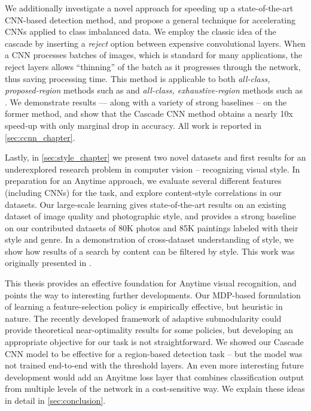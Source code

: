 We additionally investigate a novel approach for speeding up a state-of-the-art CNN-based detection method, and propose a general technique for accelerating CNNs applied to class imbalanced data.
We employ the classic idea of the cascade by inserting a \emph{reject} option between expensive convolutional layers.
When a CNN processes batches of images, which is standard for many applications, the reject layers allows ``thinning'' of the batch as it progresses through the network, thus saving processing time.
This method is applicable to both \emph{all-class, proposed-region} methods such as \cite{Girshick-CVPR-2014} and \emph{all-class, exhaustive-region} methods such as \cite{He-ECCV-2014}.
We demonstrate results --- along with a variety of strong baselines -- on the former method, and show that the Cascade CNN method obtains a nearly 10x speed-up with only marginal drop in accuracy.
All work is reported in \autoref{sec:ccnn_chapter}.

Lastly, in \autoref{sec:style_chapter} we present two novel datasets and first results for an underexplored research problem in computer vision -- recognizing visual style.
In preparation for an Anytime approach, we evaluate several different features (including CNNs) for the task, and explore content-style correlations in our datasets.
Our large-scale learning gives state-of-the-art results on an existing dataset of image quality and photographic style, and provides a strong baseline on our contributed datasets of 80K photos and 85K paintings labeled with their style and genre.
In a demonstration of cross-dataset understanding of style, we show how results of a search by content can be filtered by style.
This work was originally presented in \cite{Karayev-BMVC-2014}.

This thesis provides an effective foundation for Anytime visual recognition, and points the way to interesting further developments.
Our MDP-based formulation of learning a feature-selection policy is empirically effective, but heuristic in nature.
The recently developed framework of adaptive submodularity \parencite{Golovin-and-Krause-2010-JAIR} could provide theoretical near-optimality results for some policies, but developing an appropriate objective for our task is not straightforward.
We showed our Cascade CNN model to be effective for a region-based detection task -- but the model was not trained end-to-end with the threshold layers.
An even more interesting future development would add an Anyitme loss layer that combines classification output from multiple levels of the network in a cost-sensitive way.
We explain these ideas in detail in \autoref{sec:conclusion}.
